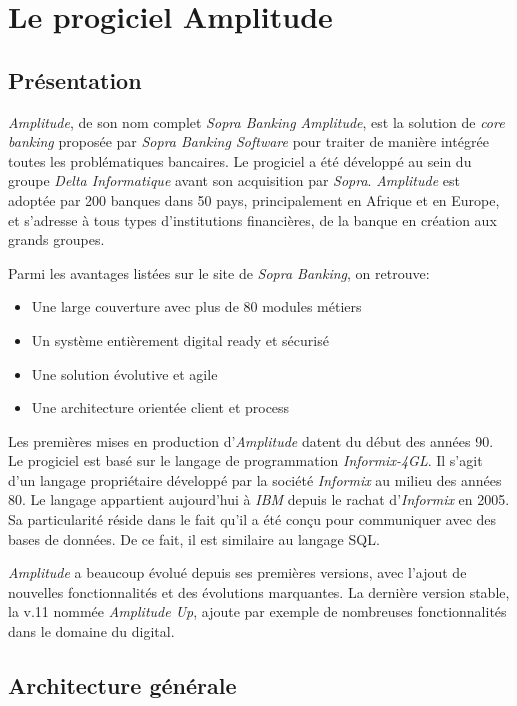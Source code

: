 \documentclass{polytech/polytech}
\begin{document}
\chapter{Le progiciel Amplitude}

\section{Présentation}

\textit{Amplitude}, de son nom complet \textit{Sopra Banking Amplitude}, est la solution de \textit{core banking} proposée par \textit{Sopra Banking Software} pour traiter de manière intégrée toutes les problématiques bancaires. Le progiciel a été développé au sein du groupe \textit{Delta Informatique} avant son acquisition par \textit{Sopra}. \textit{Amplitude} est adoptée par 200 banques dans 50 pays, principalement en Afrique et en Europe, et s’adresse à tous types d’institutions financières, de la banque en création aux grands groupes.

Parmi les avantages listées sur le site de \textit{Sopra Banking}, on retrouve: 

\begin{itemize}
	\item Une large couverture avec plus de 80 modules métiers
	\item Un système entièrement digital ready et sécurisé
	\item Une solution évolutive et agile
	\item Une architecture orientée client et process	
\end{itemize}

Les premières mises en production d'\textit{Amplitude} datent du début des années 90. Le progiciel est basé sur le langage de programmation \textit{Informix-4GL}. Il s'agit d'un langage propriétaire développé par la société \textit{Informix} au milieu des années 80. Le langage appartient aujourd'hui à \textit{IBM} depuis le rachat d'\textit{Informix} en 2005. Sa particularité réside dans le fait qu'il a été conçu pour communiquer avec des bases de données. De ce fait, il est similaire au langage SQL. 	

\textit{Amplitude} a beaucoup évolué depuis ses premières versions, avec l'ajout de nouvelles fonctionnalités et des évolutions marquantes. La dernière version stable, la v.11 nommée \textit{Amplitude Up}, ajoute par exemple de nombreuses fonctionnalités dans le domaine du digital.

\section{Architecture générale}
\end{document}
